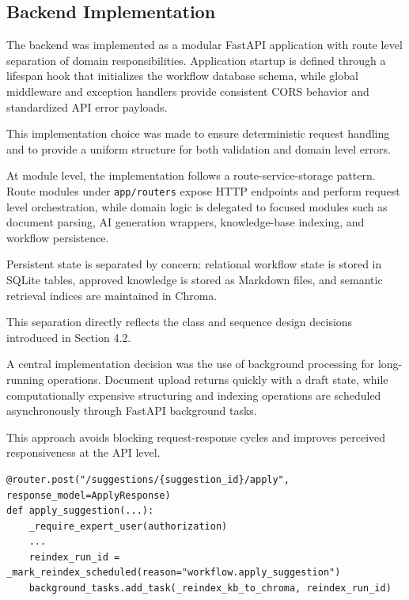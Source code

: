 \subsection{Backend Implementation}

The backend was implemented as a modular FastAPI application with route level separation of domain responsibilities.
Application startup is defined through a lifespan hook that initializes the workflow database schema, while global middleware and exception handlers provide consistent CORS behavior and standardized API error payloads.

\vspace{0.3cm}

This implementation choice was made to ensure deterministic request handling and to provide a uniform structure for both validation and domain level errors.

At module level, the implementation follows a route-service-storage pattern.  
Route modules under \texttt{app/routers} expose HTTP endpoints and perform request level orchestration, while domain logic is delegated to focused modules such as document parsing, AI generation wrappers, knowledge-base indexing, and workflow persistence.

\vspace{0.3cm}

Persistent state is separated by concern: relational workflow state is stored in SQLite tables, approved knowledge is stored as Markdown files, and semantic retrieval indices are maintained in Chroma.

This separation directly reflects the class and sequence design decisions introduced in Section 4.2.

\vspace{0.3cm}

A central implementation decision was the use of background processing for long-running operations.  
Document upload returns quickly with a draft state, while computationally expensive structuring and indexing operations are scheduled asynchronously through FastAPI background tasks.

\vspace{0.3cm}

This approach avoids blocking request-response cycles and improves perceived responsiveness at the API level.

\begin{listing}[H]
\begin{verbatim}
@router.post("/suggestions/{suggestion_id}/apply", response_model=ApplyResponse)
def apply_suggestion(...):
    _require_expert_user(authorization)
    ...
    reindex_run_id = _mark_reindex_scheduled(reason="workflow.apply_suggestion")
    background_tasks.add_task(_reindex_kb_to_chroma, reindex_run_id)
\end{verbatim}
\caption{Apply endpoint implementation showing authorization and asynchronous reindex scheduling.}
\label{code:apply-reindex}
\end{listing}



